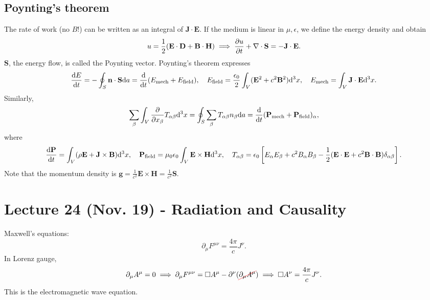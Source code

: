\documentclass{article}
\begin{document}
\subsection{Poynting's theorem}
The rate of work (no $B$!) can be written as an integral of $\mathbf J\cdot\mathbf E$. If the medium is linear in $\mu,\epsilon$, we define the energy density and obtain
$$u=\frac 12(\mathbf E\cdot\mathbf D+\mathbf B\cdot\mathbf H)\implies \frac{\partial u}{\partial t}+\nabla\cdot\mathbf S=-\mathbf J\cdot\mathbf E.$$
$\mathbf S$, the energy flow, is called the Poynting vector. Poynting's theorem expresses 
$$\frac{\mathrm{d}E}{\mathrm{d}t}=-\oint_S\mathbf n\cdot\mathbf S\dd a=\frac{\mathrm{d}}{\mathrm{d}t}(E_\text{mech}+E_\text{field}),\quad E_\text{field}=\frac{\epsilon_0}2\int_V(\mathbf E^2+c^2\mathbf B^2)\dd^3x,\quad E_\text{mech}=\int_V\mathbf J\cdot\mathbf E\dd^3x.$$
Similarly, 
$$\sum_\beta\int_V \frac{\partial }{\partial x_\beta}T_{\alpha\beta}\dd^3x=\oint_S\sum_\beta T_{\alpha\beta}n_\beta\dd a=\frac{\mathrm{d}}{\mathrm{d}t}(\mathbf P_\text{mech}+\mathbf P_\text{field})_\alpha,$$
where
$$\frac{\mathrm{d}\mathbf P}{\mathrm{d}t}=\int_V(\rho\mathbf E+\mathbf J\times\mathbf B)\dd^3x,\quad \mathbf P_\text{field}=\mu_0\epsilon_0\int_V\mathbf E\times\mathbf H\dd^3x,\quad T_{\alpha\beta}=\epsilon_0\left[E_\alpha E_\beta+c^2B_\alpha B_\beta-\frac 12(\mathbf E\cdot\mathbf E+c^2\mathbf B\cdot\mathbf B)\delta_{\alpha\beta}\right].$$
Note that the momentum density is $\mathbf g=\frac 1{c^2}\mathbf E\times\mathbf H=\frac 1{c^2}\mathbf S.$

\section{Lecture 24 (Nov. 19) - Radiation and Causality}

Maxwell's equations:
$$\partial_\mu F^{\mu\nu}=\frac{4\pi}cJ^\nu.$$
In Lorenz gauge, 
$$\partial_\mu A^\mu=0\implies\partial_\mu F^{\mu\nu}=\Box A^\mu-\partial^\nu(\Ccancel[red]{\partial_\mu A^\mu})\implies \Box A^\nu=\frac{4\pi}cJ^\nu.$$
This is the electromagnetic wave equation.
\end{document}

